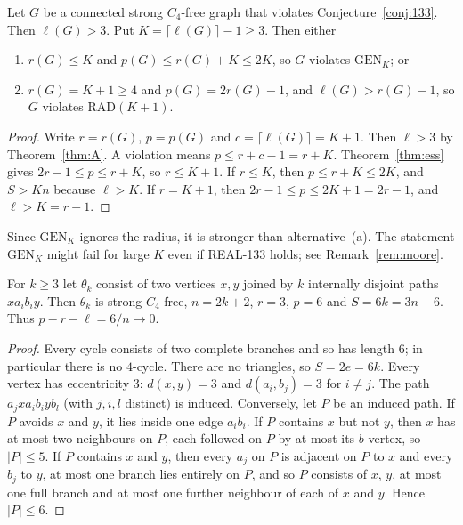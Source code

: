 \documentclass[ASNA]{USG}
\theoremstyle{WBstyletwo}
\numberwithin{equation}{section}
\newcommand{\lr}{\ell}
\newcommand{\pp}{p}
\newcommand{\GEN}{\mathrm{GEN}}
\newcommand{\RAD}{\mathrm{RAD}}
\begin{document}
\begin{corollary}\label{cor:reduction}
Let $G$ be a connected strong $C_4$-free graph that violates Conjecture~\ref{conj:133}. Then $\lr(G)>3$. Put $K=\lceil\lr(G)\rceil-1\ge 3$. Then either
\begin{enumerate}
\item[(a)] $r(G)\le K$ and $\pp(G)\le r(G)+K\le 2K$, so $G$ violates $\GEN_K$; or
\item[(b)] $r(G)=K+1\ge 4$ and $\pp(G)=2r(G)-1$, and $\lr(G)>r(G)-1$, so $G$ violates $\RAD(K+1)$.
\end{enumerate}
\end{corollary}

\begin{proof}
Write $r=r(G)$, $\pp=\pp(G)$ and $c=\lceil\lr(G)\rceil=K+1$. Then $\lr>3$ by Theorem~\ref{thm:A}. A violation means $\pp\le r+c-1=r+K$. Theorem~\ref{thm:ess} gives $2r-1\le\pp\le r+K$, so $r\le K+1$. If $r\le K$, then $\pp\le r+K\le 2K$, and $S>Kn$ because $\lr>K$. If $r=K+1$, then $2r-1\le\pp\le 2K+1=2r-1$, and $\lr>K=r-1$.
\end{proof}

Since $\GEN_K$ ignores the radius, it is stronger than alternative~(a). The statement $\GEN_K$ might fail for large $K$ even if REAL-133 holds; see Remark~\ref{rem:moore}.

\begin{proposition}\label{prop:theta}
For $k\ge 3$ let $\theta_k$ consist of two vertices $x,y$ joined by $k$ internally disjoint paths $xa_ib_iy$. Then $\theta_k$ is strong $C_4$-free, $n=2k+2$, $r=3$, $\pp=6$ and $S=6k=3n-6$. Thus $\pp-r-\lr=6/n\to 0$.
\end{proposition}

\begin{proof}
Every cycle consists of two complete branches and so has length $6$; in particular there is no $4$-cycle. There are no triangles, so $S=2e=6k$. Every vertex has eccentricity $3$: $d(x,y)=3$ and $d(a_i,b_j)=3$ for $i\ne j$. The path $a_jxa_ib_iyb_l$ (with $j,i,l$ distinct) is induced. Conversely, let $P$ be an induced path. If $P$ avoids $x$ and $y$, it lies inside one edge $a_ib_i$. If $P$ contains $x$ but not $y$, then $x$ has at most two neighbours on $P$, each followed on $P$ by at most its $b$-vertex, so $|P|\le 5$. If $P$ contains $x$ and $y$, then every $a_j$ on $P$ is adjacent on $P$ to $x$ and every $b_j$ to $y$, at most one branch lies entirely on $P$, and so $P$ consists of $x$, $y$, at most one full branch and at most one further neighbour of each of $x$ and $y$. Hence $|P|\le 6$.
\end{proof}
\end{document}
